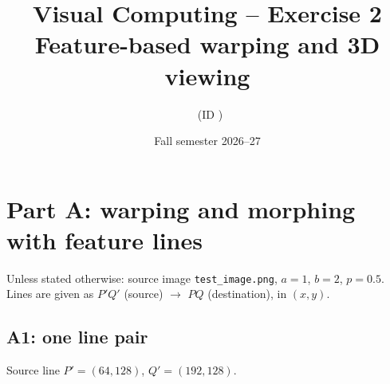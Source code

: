 \documentclass[10pt,a4paper]{article}
\title{Visual Computing -- Exercise 2\\[2pt]\large Feature-based warping and 3D viewing}
\author{\studentname\ifx\studentid\empty\else\ (ID \studentid)\fi}
\date{Fall semester 2026--27}
\begin{document}
\maketitle


\section{Part A: warping and morphing with feature lines}

Unless stated otherwise: source image \texttt{test\_image.png}, $a=1$, $b=2$, $p=0.5$.
Lines are given as $P'Q'$ (source) $\to$ $PQ$ (destination), in $(x,y)$.

\subsection{A1: one line pair}
Source line $P'=(64,128)$, $Q'=(192,128)$.
\end{document}
